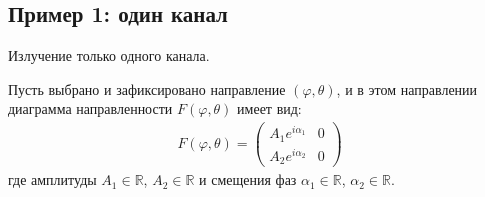 \subsection{Пример 1: один канал}

Излучение только одного канала.

Пусть выбрано и зафиксировано направление $(\varphi, \theta)$, и в этом направлении диаграмма направленности $F(\varphi, \theta)$ имеет вид:
\begin{gather*}
    F(\varphi, \theta)
    = \begin{pmatrix}
        A_1 e^{i \alpha_1} & 0 \\
        A_2 e^{i \alpha_2} & 0
    \end{pmatrix}
\end{gather*}
где амплитуды $A_1 \in \mathbb{R}$, $A_2 \in \mathbb{R}$ и смещения фаз $\alpha_1 \in \mathbb{R}$, $\alpha_2 \in \mathbb{R}$.

